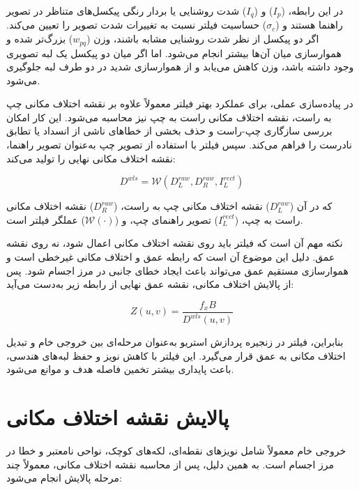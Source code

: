 در این رابطه، ($I_p$) و ($I_q$) شدت روشنایی یا بردار رنگی پیکسل‌های متناظر در تصویر راهنما هستند و ($\sigma_c$) حساسیت فیلتر نسبت به تغییرات شدت تصویر را تعیین می‌کند. اگر دو پیکسل از نظر شدت روشنایی مشابه باشند، وزن ($w_{pq}$) بزرگ‌تر شده و هموارسازی میان آن‌ها بیشتر انجام می‌شود. اما اگر میان دو پیکسل یک لبه تصویری وجود داشته باشد، وزن کاهش می‌یابد و از هموارسازی شدید در دو طرف لبه جلوگیری می‌شود.

در پیاده‌سازی عملی، برای عملکرد بهتر فیلتر  معمولاً علاوه بر نقشه اختلاف مکانی چپ به راست، نقشه اختلاف مکانی راست به چپ نیز محاسبه می‌شود. این کار امکان بررسی سازگاری چپ-راست و حذف بخشی از خطاهای ناشی از انسداد یا تطابق نادرست را فراهم می‌کند. سپس فیلتر  با استفاده از تصویر چپ به‌عنوان تصویر راهنما، نقشه اختلاف مکانی نهایی را تولید می‌کند:

\begin{equation}
	D^{wls}
	=
	\mathcal{W}
	\left(
	D_L^{raw},
	D_R^{raw},
	I_L^{rect}
	\right)
	\label{eq:wls_filter_operation}
\end{equation}

که در آن ($D_L^{raw}$) نقشه اختلاف مکانی چپ به راست، ($D_R^{raw}$) نقشه اختلاف مکانی راست به چپ، ($I_L^{rect}$) تصویر راهنمای چپ، و ($\mathcal{W}(\cdot)$) عملگر فیلتر  است.

نکته مهم آن است که فیلتر  باید روی نقشه اختلاف مکانی اعمال شود، نه روی نقشه عمق. دلیل این موضوع آن است که رابطه عمق و اختلاف مکانی غیرخطی است و هموارسازی مستقیم عمق می‌تواند باعث ایجاد خطای جانبی در مرز اجسام شود. پس از پالایش اختلاف مکانی، نقشه عمق نهایی از رابطه زیر به‌دست می‌آید:

\begin{equation}
	Z(u,v)
	=
	\frac{f_xB}{D^{wls}(u,v)}
	\label{eq:depth_from_wls_disparity}
\end{equation}

بنابراین، فیلتر  در زنجیره پردازش استریو به‌عنوان مرحله‌ای بین خروجی خام  و تبدیل اختلاف مکانی به عمق قرار می‌گیرد. این فیلتر با کاهش نویز و حفظ لبه‌های هندسی، باعث پایداری بیشتر تخمین فاصله هدف و موانع می‌شود.


\section{پالایش نقشه اختلاف مکانی}

خروجی خام  معمولاً شامل نویزهای نقطه‌ای، لکه‌های کوچک، نواحی نامعتبر و خطا در مرز اجسام است. به همین دلیل، پس از محاسبه نقشه اختلاف مکانی، معمولاً چند مرحله پالایش انجام می‌شود:

